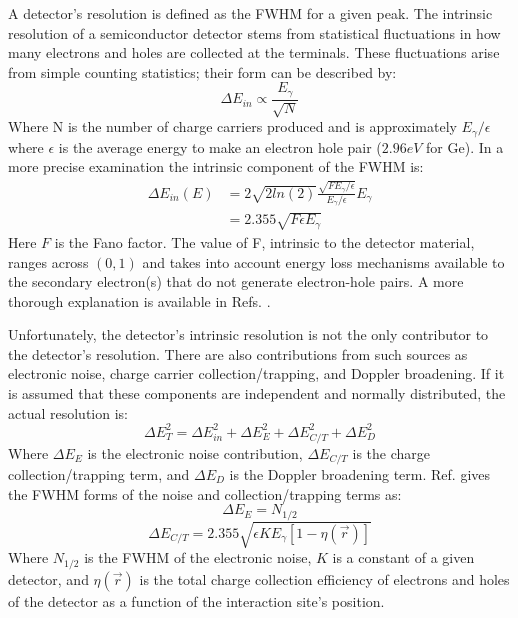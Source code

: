 A detector's resolution is defined as the FWHM for a given peak. The intrinsic resolution of a semiconductor detector stems from statistical fluctuations in how many electrons and holes are collected at the terminals. These fluctuations arise from simple counting statistics; their form can be described by:
\begin{equation}
\label{eqn:chp3-hpge-res-est} 
\Delta{}E_{in} \propto \frac{E_{\gamma}}{\sqrt{N}}
\end{equation}
Where N is the number of charge carriers produced and is approximately $E_{\gamma}/\epsilon$ where $\epsilon$ is the average energy to make an electron hole pair ($2.96eV$ for Ge). In a more precise examination the intrinsic component of the FWHM is:
\begin{equation}
\label{eqn:chp3-hpge-in-res} 
\begin{split}
\Delta{}E_{in}(E) & = 2\sqrt{2 ln(2)}\frac{\sqrt{F E_{\gamma{}}/\epsilon{}}}{E_{\gamma{}}/\epsilon{}}E_{\gamma{}}\\
       & = 2.355\sqrt{F\epsilon{}E_{\gamma{}}}
\end{split}
\end{equation}
Here $F$ is the Fano factor. The value of F, intrinsic to the detector material, ranges across $(0,1)$ and takes into account energy loss mechanisms available to the secondary electron(s) that do not generate electron-hole pairs. A more thorough explanation is available in Refs. \cite{fano_factor1,knollBook}.

Unfortunately, the detector's intrinsic resolution is not the only contributor to the detector's resolution. There are also contributions from such sources as electronic noise, charge carrier collection/trapping, and Doppler broadening. If it is assumed that these components are independent and normally distributed, the actual resolution is:
\begin{equation}
\label{eqn:chp3-hpge-res} 
\Delta{}E_{T}^2 = \Delta{}E_{in}^2 + \Delta{}E_{E}^2 + \Delta{}E_{C/T}^2 + \Delta{}E_{D}^2
\end{equation}
Where $\Delta{}E_{E}$ is the electronic noise contribution, $\Delta{}E_{C/T}$ is the charge collection/trapping term, and $\Delta{}E_{D}$ is the Doppler broadening term. Ref. \cite{trappingResolution} gives the FWHM forms of the noise and collection/trapping terms as:
\begin{equation}
\label{eqn:chp3-hpge-res-noise} 
\Delta{}E_{E} = N_{1/2}
\end{equation}
\begin{equation}
\label{eqn:chp3-hpge-res-ct} 
\Delta{}E_{C/T} = 2.355\sqrt{\epsilon{} K E_{\gamma{}} [1-\eta{}(\vec{r})]}
\end{equation}
Where $N_{1/2}$ is the FWHM of the electronic noise, $K$ is a constant of a given detector, and $\eta{}(\vec{r})$ is the total charge collection efficiency of electrons and holes of the detector as a function of the interaction site's position.

